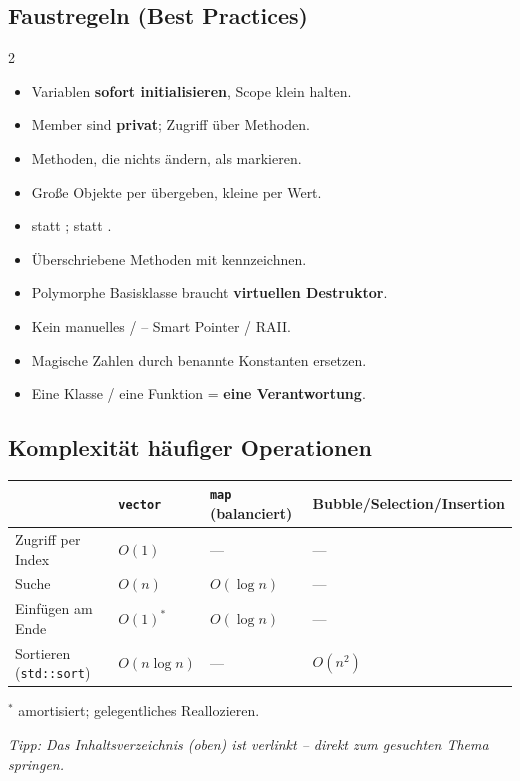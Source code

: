 \subsection*{Faustregeln (Best Practices)}
\begin{multicols}{2}
\begin{itemize}
  \item Variablen \textbf{sofort initialisieren}, Scope klein halten.
  \item Member sind \textbf{privat}; Zugriff \"uber Methoden.
  \item Methoden, die nichts \"andern, als  markieren.
  \item Gro\ss e Objekte per  \"ubergeben, kleine per Wert.
  \item {} statt ;  statt .
  \item \"Uberschriebene Methoden mit  kennzeichnen.
  \item Polymorphe Basisklasse braucht \textbf{virtuellen Destruktor}.
  \item Kein manuelles / -- Smart Pointer / RAII.
  \item Magische Zahlen durch benannte Konstanten ersetzen.
  \item Eine Klasse / eine Funktion = \textbf{eine Verantwortung}.
\end{itemize}
\end{multicols}

\subsection*{Komplexit\"at h\"aufiger Operationen}
\begin{center}\small
\begin{tabular}{@{}llll@{}}
\toprule
 & \texttt{vector} & \texttt{map} (balanciert) & Bubble/Selection/Insertion \\
\midrule
Zugriff per Index & $O(1)$ & --- & --- \\
Suche & $O(n)$ & $O(\log n)$ & --- \\
Einf\"ugen am Ende & $O(1)^{*}$ & $O(\log n)$ & --- \\
Sortieren (\texttt{std::sort}) & $O(n\log n)$ & --- & $O(n^2)$ \\
\bottomrule
\end{tabular}
\end{center}
{\footnotesize $^{*}$ amortisiert; gelegentliches Reallozieren.}

\bigskip
\noindent\textit{Tipp: Das Inhaltsverzeichnis (oben) ist verlinkt -- direkt zum gesuchten Thema springen.}
\clearpage
